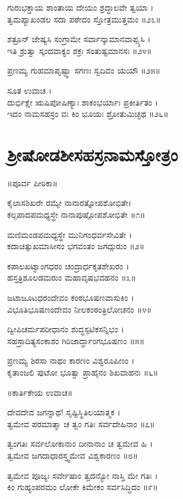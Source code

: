 ಗುರುಭಕ್ತಾಯ ಶಾಂತಾಯ ದೇಯಂ ಶ್ರದ್ಧಾಲವೇ ತ್ವಯಾ ।\\
ತ್ವಮಪ್ಯಾಖಂಡಲ ಸದಾ ಪಠೇದಂ ಸ್ತೋತ್ರಮುತ್ತಮಂ ॥೨೩॥

ಶತ್ರೂನ್ ಜೇಷ್ಯಸಿ ಸಂಗ್ರಾಮೇ ಸರ್ವಾನ್ಕಾಮಾನವಾಪ್ಸ್ಯಸಿ ।\\
ಇತಿ ಶ್ರುತ್ವಾ ಸ್ಕಂದವಾಕ್ಯಂ ಶಕ್ರಃ ಸಂತುಷ್ಟಮಾನಸಃ ॥೨೪॥

ಪ್ರಣಮ್ಯ ಗುಹಮಾಪೃಷ್ಟ್ವಾ ಸಗಣಃ ಸ್ವದಿವಂ ಯಯೌ ॥೨೫॥

ಸೂತ ಉವಾಚ ।\\
ದುರ್ಭಿಕ್ಷೇ ಋಷಿಪೋಷಿಣ್ಯಾಃ ಶಾಕಂಭರ್ಯಾಃ ಪ್ರಕೀರ್ತಿತಂ ।\\
ಇದಂ ನಾಮಸಹಸ್ರಂ ವಃ ಕಿಂ ಭೂಯಃ ಶ್ರೋತುಮಿಚ್ಛಥ ॥೨೬॥

\section{ಶ್ರೀಷೋಡಶೀಸಹಸ್ರನಾಮಸ್ತೋತ್ರಂ}


॥ಪೂರ್ವ ಪೀಠಿಕಾ॥

ಕೈಲಾಸಶಿಖರೇ ರಮ್ಯೇ ನಾನಾರತ್ನೋಪಶೋಭಿತೇ।\\
ಕಲ್ಪಪಾದಪಮಧ್ಯಸ್ಥೇ ನಾನಾಪುಷ್ಪೋಪಶೋಭಿತೇ ॥೧॥

ಮಣಿಮಂಡಪಮಧ್ಯಸ್ಥೇ ಮುನಿಗಂಧರ್ವಸೇವಿತೇ ।\\
ಕದಾಚಿತ್ಸುಖಮಾಸೀನಂ ಭಗವಂತಂ ಜಗದ್ಗುರುಂ ॥೨॥

ಕಪಾಲಖಟ್ವಾಂಗಧರಂ ಚಂದ್ರಾರ್ಧಕೃತಶೇಖರಂ ।\\
ಹಸ್ತತ್ರಿಶೂಲಡಮರುಂ ಮಹಾವೃಷಭವಹನಂ ॥೩॥

ಜಟಾಜೂಟಧರಂದೇವಂ ಕಂಠಭೂಷಣವಾಸುಕಿಂ ।\\
ವಿಭೂತಿಭೂಷಣಂದೇವಂ ನೀಲಕಂಠಂತ್ರಿಲೋಚನಂ ॥೪॥

ದ್ವೀಪಿಚರ್ಮಪರೀಧಾನಂ ಶುದ್ಧಸ್ಫಟಿಕಸನ್ನಿಭಂ ।\\
ಸಹಸ್ರಾದಿತ್ಯಸಂಕಾಶಂ ಗಿರಿಜಾರ್ದ್ಧಾಂಗಭೂಷಣಂ ॥೫॥

ಪ್ರಣಮ್ಯ ಶಿರಸಾ ನಾಥಂ ಕಾರಣಂ ವಿಶ್ವರೂಪಿಣಂ ।\\
ಕೃತಾಂಜಲಿ ಪುಟೋ ಭೂತ್ವಾ ಪ್ರಾಹೈನಂ ಶಿಖವಾಹನಃ ॥೬॥

॥ಕಾರ್ತಿಕೇಯ ಉವಾಚ॥

ದೇವದೇವ ಜಗನ್ನಾಥ! ಸೃಷ್ಟಿಸ್ಥಿತಿಲಯಾತ್ಮಕ ।\\
ತ್ವಮೇವ ಪರಮಾತ್ಮಾ ಚ ತ್ವಂ ಗತಿಃ ಸರ್ವದೇಹಿನಾಂ ॥೭॥

ತ್ವಂಗತಿಃ ಸರ್ವಲೋಕಾನಾಂ ದೀನಾನಾಂ ಚ ತ್ವಮೇವ ಹಿ ।\\
ತ್ವಮೇವ ಜಗದಾಧಾರಸ್ತ್ವಮೇವ ವಿಶ್ವಕಾರಣಂ ॥೮॥

ತ್ವಮೇವ ಪೂಜ್ಯಃ ಸರ್ವೇಷಾಂ ತ್ವದನ್ಯೋ ನಾಸ್ತಿ ಮೇ ಗತಿಃ ।\\
ಕಿಂ ಗುಹ್ಯಂಪರಮಂ ಲೋಕೇ ಕಿಮೇಕಂ ಸರ್ವಸಿದ್ಧಿದಂ ॥೯॥

